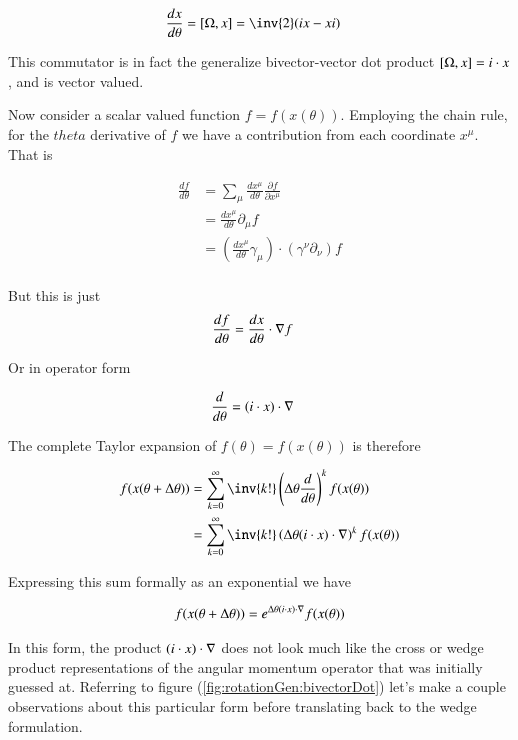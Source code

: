 \begin{align}\label{eqn:rotationGen:foo12}
\frac{dx}{d\theta} &= \antisymmetric{\Omega}{x} = \inv{2} (i x - x i)
\end{align}

This commutator is in fact the generalize bivector-vector dot product $\left[{\Omega},{x}\right] = i \cdot x$, and is vector valued.

Now consider a scalar valued function $f = f(x(\theta))$.  Employing the chain rule, for the $theta$ derivative of $f$ we have a contribution from each coordinate $x^\mu$.  That is

\begin{align*}
\frac{df}{d\theta} 
&= \sum_\mu \frac{d x^\mu}{d \theta} \frac{\partial f}{\partial x^\mu}  \\
&= \frac{d x^\mu}{d \theta} \partial_\mu f \\
&= \left( \frac{d x^\mu}{d \theta} \gamma_\mu \right) \cdot \left( \gamma^\nu \partial_\nu \right)  f \\
\end{align*}

But this is just
\begin{align}\label{eqn:rotationGen:foo13}
\frac{df}{d\theta} &= \frac{d x}{d \theta} \cdot \nabla f
\end{align}

Or in operator form

\begin{align}\label{eqn:rotationGen:foo14}
\frac{d}{d\theta} &= (i \cdot x) \cdot \nabla 
\end{align}

The complete Taylor expansion of $f(\theta) = f(x(\theta))$ is therefore 

\begin{align*}
f(x(\theta + \Delta\theta))
&=
\sum_{k=0}^\infty \inv{k!} \left( \Delta\theta \frac{d}{d\theta} \right)^k 
f(x(\theta)) \\
&=
\sum_{k=0}^\infty \inv{k!} \left( \Delta\theta (i \cdot x) \cdot \grad \right)^k 
f(x(\theta))
\end{align*}

Expressing this sum formally as an exponential we have

\begin{align}\label{eqn:rotationGen:foo20}
f(x(\theta + \Delta\theta)) = e^{\Delta\theta ( i \cdot x) \cdot \nabla} f(x(\theta))
\end{align}

In this form, the product $(i \cdot x) \cdot \nabla$ does not look much like the cross or wedge product representations of the angular momentum operator that was initially guessed at.  Referring to figure (\ref{fig:rotationGen:bivectorDot}) let's make a couple observations about this particular form before translating back to the wedge formulation.

